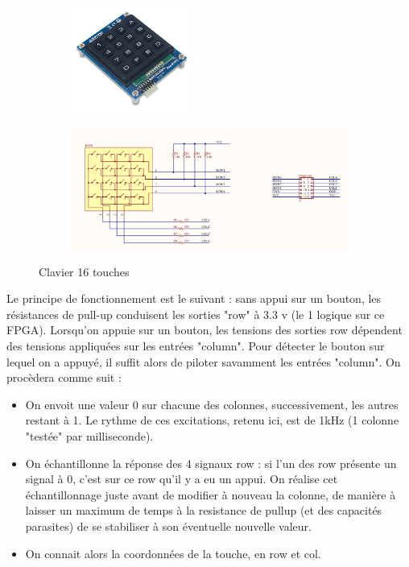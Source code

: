 \documentclass[a4paper,11pt]{article}
\begin{document}
\begin{figure}
  \centering
  \begin{subfigure}
    \centering
    \includegraphics[width=4cm]{./figures/keyboard_1.png}
  \end{subfigure}%
  \begin{subfigure}
    \centering
    \includegraphics[width=10cm]{./figures/keyboard_2.png}
  \end{subfigure}
  \caption{Clavier 16 touches}
  \label{clavier}
\end{figure}

Le principe de fonctionnement est le suivant : sans appui sur un bouton, les résistances de pull-up
conduisent les sorties "row" à 3.3 v (le 1 logique sur ce FPGA). Lorsqu'on appuie sur un bouton, les tensions des sorties row
dépendent des tensions appliquées sur les entrées "column". Pour détecter le bouton sur lequel on a appuyé, il suffit alors
de piloter savamment les entrées "column". On procèdera comme suit :
\begin{itemize}
  \item On envoit une valeur 0 sur chacune des colonnes, successivement, les autres restant à 1. Le rythme de ces excitations, retenu ici, est de 1kHz (1 colonne "testée" par milliseconde).
  \item On échantillonne la réponse des 4 signaux row : si l'un des row présente un signal à 0, c'est sur ce row qu'il y a eu un appui. On réalise cet échantillonnage juste avant
  de modifier à nouveau la colonne, de manière à laisser un maximum de temps à la resistance de pullup (et des capacités parasites) de se stabiliser à son éventuelle nouvelle valeur.
  \item On connait alors la coordonnées de la touche, en row et col.
\end{itemize}
\end{document}
